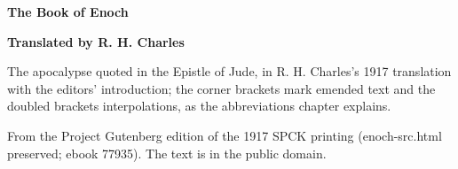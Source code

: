 \documentclass[11pt,letterpaper]{article}
\begin{document}
\color{ink}

\begin{titlepage}
\centering
\vspace*{4em}
{\LARGE\bfseries\color{heading} The Book of Enoch\par}
\vspace{2em}
{\Large\bfseries\color{heading} Translated by R. H. Charles\par}
\vspace{2.5em}
{\itshape\color{subhead}\parbox{0.8\linewidth}{\centering The apocalypse quoted in the Epistle of Jude, in R. H. Charles's 1917 translation with the editors' introduction; the corner brackets mark emended text and the doubled brackets interpolations, as the abbreviations chapter explains.\par}}
\vfill
{\small From the Project Gutenberg edition of the 1917 SPCK printing (enoch-src.html preserved; ebook 77935). The text is in the public domain.\par}
\vspace{2em}
\end{titlepage}

\tableofcontents


\end{document}
